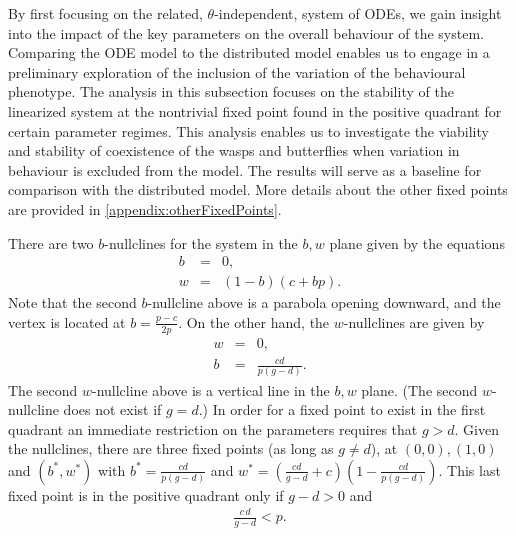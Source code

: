 \documentclass[review,authoryear]{elsarticle}
\begin{document}
By first focusing on the related, $\theta$-independent, system of ODEs, we gain insight into the impact of the key parameters on the overall behaviour of the system. Comparing the ODE model to the distributed model enables us to engage in a preliminary exploration of the inclusion of the variation of the behavioural phenotype.  The analysis in
this subsection focuses on the stability of the linearized system at the
nontrivial fixed point found in the positive quadrant for certain parameter regimes. This analysis enables us to investigate the viability and stability of coexistence of the wasps and butterflies when variation in behaviour is excluded from the model. The results will serve as a baseline for comparison with the distributed model. More details about the other fixed points are
provided in  \ref{appendix:otherFixedPoints}.

There are two $b$-nullclines for the system in the $b,w$ plane given by the equations
\begin{eqnarray}
  \label{eq:bnullclines}
  b & = & 0, \\
  w & = & (1-b)(c+b p).
\end{eqnarray}
Note that the second $b$-nullcline above is a parabola opening downward, and the vertex is located at
$b=\frac{p-c}{2p}$. On the other hand, the $w$-nullclines are given by
\begin{eqnarray}
  \label{eq:wnullclines}
  w & = & 0, \\
  b & = & \frac{cd}{p(g-d)}.
\end{eqnarray}
The second $w$-nullcline above is a vertical line in the $b,w$ plane. (The second $w$-nullcline does not exist if $g=d$.) In
order for a fixed point to exist in the first quadrant an immediate
restriction on the parameters requires that $g>d$.  Given the
nullclines, there are three fixed points (as long as $g\ne d$), at $(0,0), (1,0)$ and $(b^*,w^*)$ with $b^*=\frac{cd}{p (g-d)}$ and
$w^*=\left(\frac{cd}{g-d}+c\right)\left(1-\frac{cd}{p (g-d)}\right)$.  This last fixed point is in the positive quadrant only if $g-d>0$ and
\begin{eqnarray}
\label{eqn:positivityRequirement}
\frac{c\,d}{g-d}<p.
\end{eqnarray}
\end{document}
